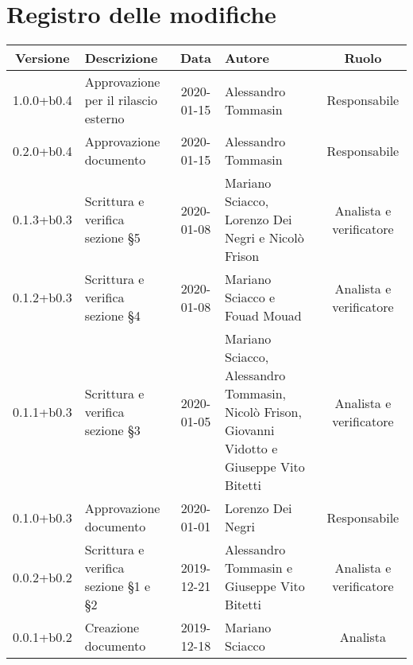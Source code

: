 \section*{Registro delle modifiche}

\begin{center}
	\begin{longtable}{|c|p{3cm}|c|p{4cm}|c|}
	\hline
	\rowcolor{lighter-grayer}
	\textbf{Versione} & \textbf{Descrizione} & \textbf{Data} & \textbf{Autore} & \textbf{Ruolo} \\
	\hline
	\endfirsthead

	1.0.0+b0.4 & Approvazione per il rilascio esterno & 2020-01-15 & Alessandro Tommasin & Responsabile \\
	\hline
	0.2.0+b0.4 & Approvazione documento & 2020-01-15 & Alessandro Tommasin & Responsabile \\
	\hline
	0.1.3+b0.3 & Scrittura e verifica sezione \S5 & 2020-01-08 & Mariano Sciacco, Lorenzo Dei Negri e Nicolò Frison & Analista e verificatore \\
	\hline
	0.1.2+b0.3 & Scrittura e verifica sezione \S4 & 2020-01-08 & Mariano Sciacco e Fouad Mouad & Analista e verificatore \\
	\hline
	0.1.1+b0.3 & Scrittura e verifica sezione \S3 & 2020-01-05 & Mariano Sciacco, Alessandro Tommasin, Nicolò Frison, Giovanni Vidotto e Giuseppe Vito Bitetti & Analista e verificatore \\
	\hline
	0.1.0+b0.3 & Approvazione documento & 2020-01-01 & Lorenzo Dei Negri & Responsabile \\
	\hline
	0.0.2+b0.2 & Scrittura e verifica sezione \S1 e \S2 & 2019-12-21 & Alessandro Tommasin e Giuseppe Vito Bitetti & Analista e verificatore \\
	\hline
	0.0.1+b0.2 & Creazione documento & 2019-12-18 & Mariano Sciacco & Analista \\
	\hline

	\end{longtable}
\end{center}
